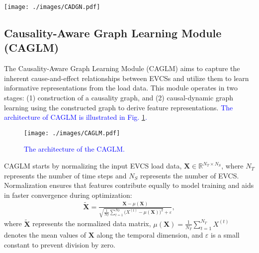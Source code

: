 \documentclass[lettersize,journal]{IEEEtran}
\newcommand{\hl}[1]{\textcolor{blue}{#1}}
\begin{document}
\begin{figure*}[t!]
	\centering
	\vspace{-6pt}
	\texttt{[image: ./images/CADGN.pdf]}
	\caption{Overall architecture of the CADGN model for EVCS load forecasting.} 
	\vspace{-15pt}
	\label{fig:overview}
\end{figure*}

\vspace{-8pt}
\subsection{Causality-Aware Graph Learning Module (CAGLM)}

The Causality-Aware Graph Learning Module (CAGLM) aims to capture the inherent cause-and-effect relationships between EVCSs and utilize them to learn informative representations from the load data. This module operates in two stages: (1) construction of a causality graph, and (2) causal-dynamic graph learning using the constructed graph to derive feature representations. 
\hl{The architecture of CAGLM is illustrated in Fig. \ref{fig:CAGLM}.}
\begin{figure} [t!]
    \centering
    \texttt{[image: ./images/CAGLM.pdf]}
    \caption{\hl{The architecture of the CAGLM.}}
    \vspace{-10pt}
\label{fig:CAGLM}
\end{figure}
CAGLM starts by normalizing the input EVCS load data, $\bm{X} \in \mathbb{R}^{N_T \times N_S}$, where $N_T$ represents the number of time steps and $N_S$ represents the number of EVCS. Normalization ensures that features contribute equally to model training and aids in faster convergence during optimization:
\begin{equation}
\begin{aligned}
\tilde{\bm{X}} = \frac{\bm{X} - \mu(\bm{X})}{\sqrt{\frac{1}{N_T} \sum_{t=1}^{N_T} \Big(X^{(t)} - \mu(\bm{X}) \Big)^2} + \varepsilon},
\end{aligned}
\label{eq:normalization}
\end{equation}
where $\tilde{\bm{X}}$ represents the normalized data matrix, $\mu(\bm{X}) = \frac{1}{N_T} \sum_{t=1}^{N_T} X^{(t)}$ denotes the mean values of $\bm{X}$ along the temporal dimension, and $\varepsilon$ is a small constant to prevent division by zero.
\end{document}

